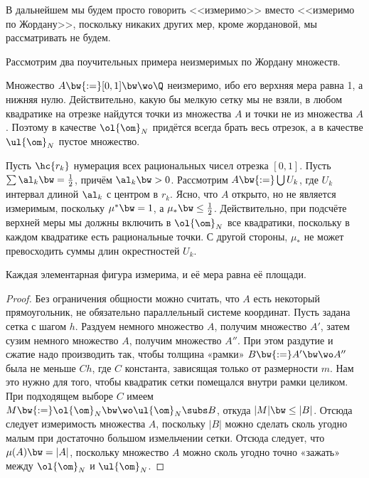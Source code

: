 \documentclass[a4paper]{article}
\begin{document}
\begin{note}
В дальнейшем мы будем просто говорить <<измеримо>> вместо <<измеримо по Жордану>>, поскольку
никаких других мер, кроме жордановой, мы рассматривать не будем.
\end{note}

Рассмотрим два поучительных примера неизмеримых по Жордану множеств.

\begin{ex}
Множество $A\bw{:=}[0,1] \bw\wo \Q$ неизмеримо, ибо его верхняя мера равна 1, а нижняя нулю.
Действительно, какую бы мелкую сетку мы не взяли, в любом квадратике на отрезке найдутся точки из
множества $A$ и точки не из множества $A$. Поэтому в качестве $\ol{\om}_N$ придётся всегда брать
весь отрезок, а в качестве $\ul{\om}_N$ пустое множество.
\end{ex}

\begin{ex}
Пусть $\hc{r_k}$ нумерация всех рациональных чисел отрезка $[0,1]$. Пусть $\sum \al_k \bw=
\frac{1}{2}$, причём $\al_k \bw> 0$. Рассмотрим $A\bw{:=}\bigcup U_k$, где $U_k$ интервал длиной
$\al_k$ с центром в $r_k$. Ясно, что $A$ открыто, но не является измеримым, поскольку $\mu^* \bw= 1$,
а $\mu_*\bw\le \frac{1}{2}$. Действительно, при подсчёте верхней меры мы должны включить в
$\ol{\om}_N$ все квадратики, поскольку в каждом квадратике есть рациональные точки. С другой
стороны, $\mu_*$ не может превосходить суммы длин окрестностей $U_k$.
\end{ex}

\begin{theorem}
Каждая элементарная фигура измерима, и её мера равна её площади.
\end{theorem}
\begin{proof}
Без ограничения общности можно считать, что $A$ есть некоторый прямоугольник, не обязательно
параллельный системе координат. Пусть задана сетка с шагом $h$. Раздуем немного множество $A$,
получим множество $A'$, затем сузим немного множество $A$, получим множество $A''$. При этом
раздутие и сжатие надо производить так, чтобы толщина «рамки» $B \bw{:=}A' \bw\wo A''$ была не меньше
$Ch$, где $C$ константа, зависящая только от размерности $m$. Нам это нужно для того, чтобы
квадратик сетки помещался внутри рамки целиком. При подходящем выборе $C$ имеем $M
\bw{:=}\ol{\om}_N \bw\wo \ul{\om}_N \subs B$, откуда $|M| \bw\le |B|$. Отсюда следует измеримость
множества $A$, поскольку $|B|$ можно сделать сколь угодно малым при достаточно большом измельчении
сетки. Отсюда следует, что $\mu(A) \bw= |A|$, поскольку множество $A$ можно сколь угодно точно
«зажать» между $\ol{\om}_N$ и $\ul{\om}_N$.
\end{proof}
\end{document}
